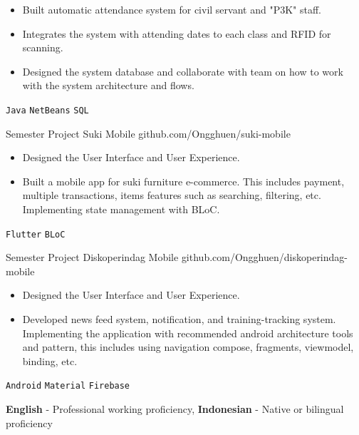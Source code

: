 \documentclass[9pt]{developercv} %
\begin{document}
\begin{entrylist}
{\begin{itemize}[noitemsep,topsep=0pt,parsep=0pt,partopsep=0pt, leftmargin=-1pt]
			\item {Built automatic attendance system for civil servant and "P3K" staff.}
			\item {Integrates the system with attending dates to each class and RFID for scanning.}
			\item {Designed the system database and collaborate with team on how to work with the system architecture and flows.}
		\end{itemize}
		\texttt{Java} \slashsep \texttt{NetBeans} \slashsep \texttt{SQL}}
	\entry
	{Semester Project}
	{Suki Mobile}
	{github.com/Ongghuen/suki-mobile}
	{\vspace{-10 pt}
		\begin{itemize}[noitemsep,topsep=0pt,parsep=0pt,partopsep=0pt, leftmargin=-1pt]
			\item Designed the User Interface and User Experience.
			\item Built a mobile app for suki furniture e-commerce. This includes payment, multiple transactions, items features such as searching, filtering, etc. Implementing state management with BLoC.
		\end{itemize}
		\texttt{Flutter} \slashsep \texttt{BLoC}}
	\entry
	{Semester Project}
	{Diskoperindag Mobile}
	{github.com/Ongghuen/diskoperindag-mobile}
	{\vspace{-10 pt}
		\begin{itemize}[noitemsep,topsep=0pt,parsep=0pt,partopsep=0pt, leftmargin=-1pt]
			\item Designed the User Interface and User Experience.
			\item Developed news feed system, notification, and training-tracking system. Implementing the application with recommended android architecture tools and pattern, this includes using navigation compose, fragments, viewmodel, binding, etc.
		\end{itemize}
		\texttt{Android} \slashsep \texttt{Material} \slashsep \texttt{Firebase}
	}
\end{entrylist}

\vspace{-10 pt}
\vspace{-6pt}

\hspace{26mm} \textbf{English} - Professional working proficiency, \textbf{ Indonesian} - Native or bilingual proficiency
\end{document}
